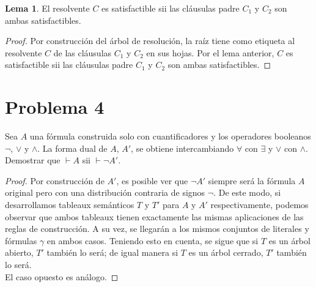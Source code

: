 \documentclass[letterpaper,12pt]{memoir}
\theoremstyle{definition}
\newtheorem*{lem}{Lema}
\begin{document}
\begin{lem}
  El resolvente \(C\) es satisfactible sii las cláusulas padre \(C_1\) y \(C_2\) son ambas satisfactibles.
\end{lem}

\begin{proof}
  Por construcción del árbol de resolución, la raíz tiene como etiqueta al resolvente \(C\) de las cláusulas \(C_1\) y \(C_2\)  en sus hojas. Por el lema anterior, \(C\) es satisfactible sii las cláusulas padre \(C_1\) y \(C_2\) son ambas satisfactibles.
\end{proof}


\section*{Problema 4}

Sea \(A\) una fórmula construida solo con cuantificadores y los operadores booleanos \(\neg\), \(\lor\) y \(\land\). La forma dual de \(A\), \(A'\), se obtiene intercambiando \(\forall\) con \(\exists\) y \(\lor\) con \(\land\). Demostrar que \(\vdash A\) sii \(\vdash \neg A'\).

\begin{proof}
  Por construcción de \(A'\), es posible ver que \(\neg A'\) siempre será la fórmula \(A\) original pero con una distribución contraria de signos \(\neg\). De este modo, si desarrollamos tableaux semánticos \(T\) y \(T'\) para \(A\) y \(A'\) respectivamente, podemos observar que ambos tableaux tienen exactamente las mismas aplicaciones de las reglas de construcción. A su vez, se llegarán a los mismos conjuntos de literales y fórmulas \(\gamma\) en ambos casos. Teniendo esto en cuenta, se sigue que si \(T\) es un árbol abierto, \(T'\) también lo será; de igual manera si \(T\) es un árbol cerrado, \(T'\) también lo será.\\

  El caso opuesto es análogo.
\end{proof}
\end{document}
